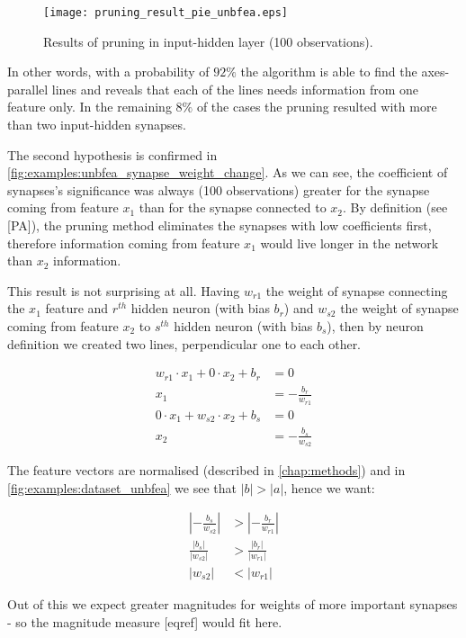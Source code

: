 \begin{figure}[H]
\centering
\texttt{[image: pruning\_result\_pie\_unbfea.eps]}
\caption{Results of pruning in input-hidden layer (100 observations).}
\label{fig:examples:pruning_result_pie_unbfea}
\end{figure}

In other words, with a probability of $ 92\% $ the algorithm is able to find the axes-parallel lines and reveals that each of the lines needs information from one feature only. In the remaining $ 8\% $ of the cases the pruning resulted with more than two input-hidden synapses.

The second hypothesis is confirmed in \cref{fig:examples:unbfea_synapse_weight_change}. As we can see, the coefficient of synapses's significance was always (100 observations) greater for the synapse coming from feature $ x_1 $ than for the synapse connected to $ x_2 $. By definition (see [PA]), the pruning method eliminates the synapses with low coefficients first, therefore information coming from feature $ x_1 $ would live longer in the network than $ x_2 $ information.

This result is not surprising at all. Having $ w_{r1} $ the weight of synapse connecting the $ x_1 $ feature and $ r^{th} $ hidden neuron (with bias $ b_r$) and $ w_{s2} $ the weight of synapse coming from feature $ x_2 $ to $ s^{th} $ hidden neuron (with bias $ b_s $), then by neuron definition \citep{article:perceptron} we created two lines, perpendicular one to each other.

\begin{align}
w_{r1} \cdot x_1 + 0 \cdot x_2 + b_r &= 0 \\
x_1 &= -\frac{b_r}{w_{r1}} \\
0 \cdot x_1 + w_{s2} \cdot x_2 + b_s &= 0 \\
x_2 &= -\frac{b_s}{w_{s2}}
\end{align}


The feature vectors are normalised (described in \cref{chap:methods}) and in \cref{fig:examples:dataset_unbfea} we see that $ |b| > |a| $, hence we want:

\begin{align}
|- \frac{b_s}{w_{s2}}| &> |- \frac{b_r}{w_{r1}}| \\
\frac{|b_s|}{|w_{s2}|} &> \frac{|b_r|}{|w_{r1}|} \\
|w_{s2}| &< |w_{r1}|
\end{align}

Out of this we expect greater magnitudes for weights of more important synapses - so the magnitude measure [eqref] would fit here.

